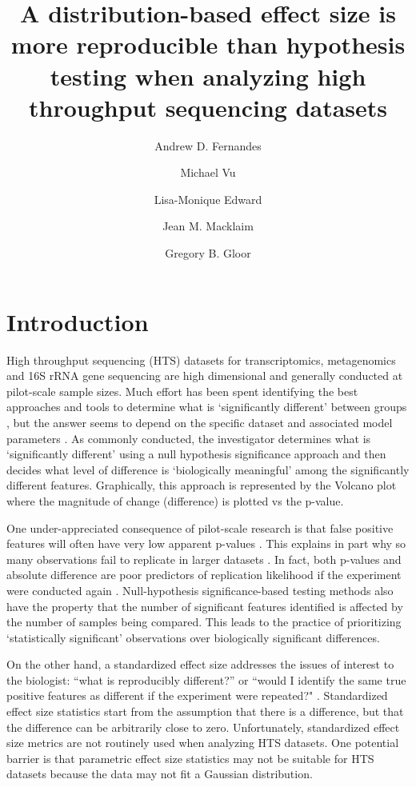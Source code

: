 \documentclass[fleqn,10pt,lineno]{wlpeerj}
\title{A distribution-based effect size is more reproducible than hypothesis testing when analyzing high throughput sequencing datasets}
\author[1,2]{Andrew D. Fernandes}
\author[2]{Michael Vu}
\author[2]{Lisa-Monique Edward}
\author[2]{Jean M. Macklaim}
\author[2]{Gregory B. Gloor}
\affil[1]{Shield AI Inc., San Diego CA, 92130, United States of America}
\affil[2]{Department of Biochemistry, University of Western Ontario, London, N6A 5C1, Canada}
\begin{document}
\flushbottom
\maketitle
\thispagestyle{empty}


\section*{Introduction}

High throughput sequencing (HTS) datasets for transcriptomics, metagenomics and 16S rRNA gene sequencing are high dimensional and generally  conducted at pilot-scale  sample sizes. Much effort has been spent identifying the best approaches and tools to determine what is `significantly different' between groups \citep{Soneson:2013,Schurch:2016aa}, but the answer seems to depend on the specific dataset and associated model parameters \citep{Thorsen:2016aa,hawinkel2017,Weiss:2017aa}. As commonly conducted, the investigator determines what is `significantly different' using a null hypothesis significance approach and then decides what level of difference is `biologically meaningful' among the significantly different features. Graphically, this approach is  represented by the Volcano plot \citep{Cui:2003aa} where the magnitude of change (difference) is plotted vs the p-value.  

One under-appreciated consequence of pilot-scale research is that false positive features will often have  very low apparent p-values \citep{Halsey:2015aa}. This explains in part why so many observations fail to replicate in larger datasets \citep{Ioannidis:2005aa}. In fact, both p-values and absolute difference are poor predictors of  replication likelihood if the experiment were conducted again \citep{Cumming:2008aa,Halsey:2015aa}. Null-hypothesis significance-based testing methods  also have the property that the number of significant features identified  is affected by the number of samples being compared. This leads to the practice of prioritizing `statistically significant' observations  over biologically  significant differences. 


On the other hand, a standardized effect size addresses the issues of interest to the biologist: ``what is reproducibly different?'' or ``would I identify the same true positive features as different if the experiment were repeated?"  \citep{coe2002s,shinichi:2004,Colquhoun:2014aa,gloor:effect}. Standardized effect size statistics start from the assumption that there is a difference, but that the difference can be arbitrarily close to zero. Unfortunately,  standardized effect size metrics are not routinely used when analyzing HTS datasets. One potential barrier  is that parametric effect size statistics may not be suitable for  HTS datasets because the data may not fit a Gaussian distribution.  
\end{document}
